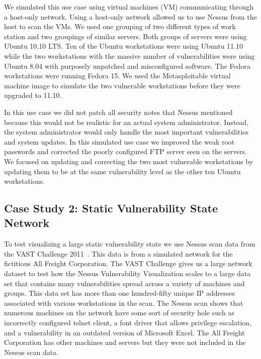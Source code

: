 \documentclass{acm_proc_article-sp}
\begin{document}
We simulated this use case using virtual machines (VM) communicating through a host-only
network. Using a host-only network allowed us to use Nessus from the host
to scan the VMs. We used one grouping of two different types of work station
and two groupings of similar servers. Both groups of servers were using Ubuntu 10.10 LTS.
Ten of the Ubuntu workstations were using Ubuntu 11.10 while the two workstations
with the massive number of vulnerabilities were using Ubuntu 8.04 with
purposely unpatched and misconfigured software.
The Fedora workstations were running Fedora 15.  We used the Metasploitable
virtual machine image to simulate the two vulnerable workstations before they
were upgraded to 11.10.

In this use case we did not patch all security notes that Nessus mentioned
because this would not be realistic for an actual system administrator. Instead,
the system administrator would only handle the most important vulnerabilities and
system updates. In this simulated use case we improved the weak root passwords
and corrected the poorly configured FTP server seen on the servers. We focused on updating
and correcting the two most vulnerable workstations by updating them to be at
the same vulnerability level as the other ten Ubuntu workstations.



\subsection{Case Study 2: Static Vulnerability State Network }
To test visualizing a large static vulnerability state we use Nessus scan data from
the VAST Challenge 2011~\cite{VAST2011}. This data is from a simulated network for the
fictitious All Freight Corporation. The VAST Challenge gives us a large network
dataset to test how the Nessus Vulnerability Visualization scales to a large
data set that contains many vulnerabilities spread across a variety of machines and
groups. This data set has more than one
hundred-fifty unique IP addresses associated with various workstations in the
scan. The Nessus scan shows that numerous
machines on the network have some sort of security hole such as incorrectly
configured telnet client, a font driver that allows privilege escalation, and a
vulnerability in an outdated version of Microsoft Excel. The All Freight
Corporation has other machines and servers but they were not included in the
Nessus scan data.
\end{document}
